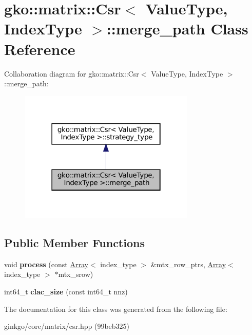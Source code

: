 \hypertarget{classgko_1_1matrix_1_1Csr_1_1merge__path}{}\section{gko\+:\+:matrix\+:\+:Csr$<$ Value\+Type, Index\+Type $>$\+:\+:merge\+\_\+path Class Reference}
\label{classgko_1_1matrix_1_1Csr_1_1merge__path}


Collaboration diagram for gko\+:\+:matrix\+:\+:Csr$<$ Value\+Type, Index\+Type $>$\+:\+:merge\+\_\+path\+:
\nopagebreak
\begin{figure}[H]
\begin{center}
\leavevmode
\includegraphics[width=238pt]{classgko_1_1matrix_1_1Csr_1_1merge__path__coll__graph}
\end{center}
\end{figure}
\subsection*{Public Member Functions}
\begin{DoxyCompactItemize}
\item 
\mbox{\label{classgko_1_1matrix_1_1Csr_1_1merge__path_a617d0a285a7851c025a56bf1ae096bc7}} 
void {\bfseries process} (const \hyperlink{classgko_1_1Array}{Array}$<$ index\+\_\+type $>$ \&mtx\+\_\+row\+\_\+ptrs, \hyperlink{classgko_1_1Array}{Array}$<$ index\+\_\+type $>$ $\ast$mtx\+\_\+srow)
\item 
\mbox{\label{classgko_1_1matrix_1_1Csr_1_1merge__path_aea68ffff5b689f63bbece61d5dc80112}} 
int64\+\_\+t {\bfseries clac\+\_\+size} (const int64\+\_\+t nnz)
\end{DoxyCompactItemize}


The documentation for this class was generated from the following file\+:\begin{DoxyCompactItemize}
\item 
ginkgo/core/matrix/csr.\+hpp (99beb325)\end{DoxyCompactItemize}
